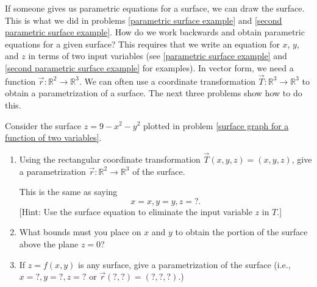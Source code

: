 If someone gives us parametric equations for a surface, we can draw the surface. This is what we did in problems \ref{parametric surface example} and \ref{second parametric surface example}. 
How do we work backwards and obtain parametric equations for a given surface?
This requires that we write an equation for $x$, $y$, and $z$ in terms of two input variables (see \ref{parametric surface example} and \ref{second parametric surface example} for examples). 
In vector form, we need a function $\vec r\colon \mathbb{R}^2\to\mathbb{R}^3$. 
We can often use a coordinate transformation $\vec T\colon \mathbb{R}^3\to\mathbb{R}^3$ to obtain a parametrization of a surface. 
The next three problems show how to do this.   
\begin{problem}\label{3d parametric plot}
%
 Consider the surface $z=9-x^2-y^2$ plotted in problem \ref{surface graph for a function of two variables}.
\begin{enumerate}
 \item 
Using the rectangular coordinate transformation $\vec T(x,y,z)=(x,y,z)$, give a parametrization $\vec r\colon \mathbb{R}^2\to\mathbb{R}^3$ of the surface. 

This is the same as saying $$x=x, y=y, z=?.$$
[Hint: Use the surface equation to eliminate the input variable $z$ in $T$.]

 \item What bounds must you place on $x$ and $y$ to obtain the portion of the surface above the plane $z=0$?
 \item If $z=f(x,y)$ is any surface, give a parametrization of the surface (i.e., $x=?, y=?, z=?$ or $\vec r (?,?)=(?,?,?)$.)
\end{enumerate}

\end{problem}
